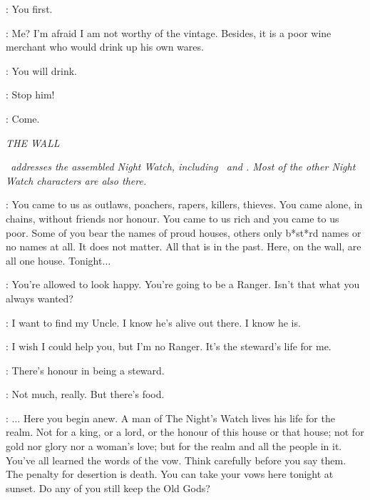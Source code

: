 \JORAH: You first. 

\WINESELLER: Me? I'm afraid I am not worthy of the vintage. Besides, it is a poor wine merchant who would drink up his own wares. 

\DAENERYS: You will drink. 


\JORAH: Stop him! 


\JORAH: Come. 


\scene

\textit{THE WALL} 

\textit{\JEOR ~addresses the assembled Night Watch, including \JON ~and \SAM. Most of the other Night Watch characters are also there.} 

\JEOR: You came to us as outlaws, poachers, rapers, killers, thieves. You came alone, in chains, without friends nor honour. You came to us rich and you came to us poor. Some of you bear the names of proud houses, others only b*st*rd names or no names at all. It does not matter. All that is in the past. Here, on the wall, are all one house. Tonight$\ldots$ 


\SAM: You're allowed to look happy. You're going to be a Ranger. Isn't that what you always wanted? 

\JON: I want to find my Uncle. I know he's alive out there. I know he is. 

\SAM: I wish I could help you, but I'm no Ranger. It's the steward's life for me. 

\JON: There's honour in being a steward. 

\SAM: Not much, really. But there's food. 

\JEOR: $\ldots$ Here you begin anew. A man of The Night's Watch lives his life for the realm. Not for a king, or a lord, or the honour of this house or that house; not for gold nor glory nor a woman's love; but for the realm and all the people in it. You've all learned the words of the vow. Think carefully before you say them. The penalty for desertion is death. You can take your vows here tonight at sunset. Do any of you still keep the  Old Gods? 

